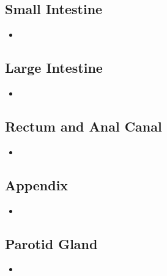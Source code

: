 \begin{itemize}
  \subsection{Small Intestine}\label{Small Intestine}
  \begin{multicols}{2}
  \begin{itemize}
    \item 
  \end{itemize}
  \end{multicols}
  
  \subsection{Large Intestine}\label{Large Intestine}
  \begin{multicols}{2}
  \begin{itemize}
    \item 
  \end{itemize}
  \end{multicols}

  \subsection{Rectum and Anal Canal}\label{Rectum and Anal Canal}
  \begin{multicols}{2}
  \begin{itemize}
    \item 
  \end{itemize}
  \end{multicols}
  
  \subsection{Appendix}\label{Appendix}
  \begin{multicols}{2}
  \begin{itemize}
    \item 
  \end{itemize}
  \end{multicols}

  \subsection{Parotid Gland}\label{Parotid Gland}
  \begin{multicols}{2}
  \begin{itemize}
    \item 
  \end{itemize}
  \end{multicols}
  

\end{itemize}
